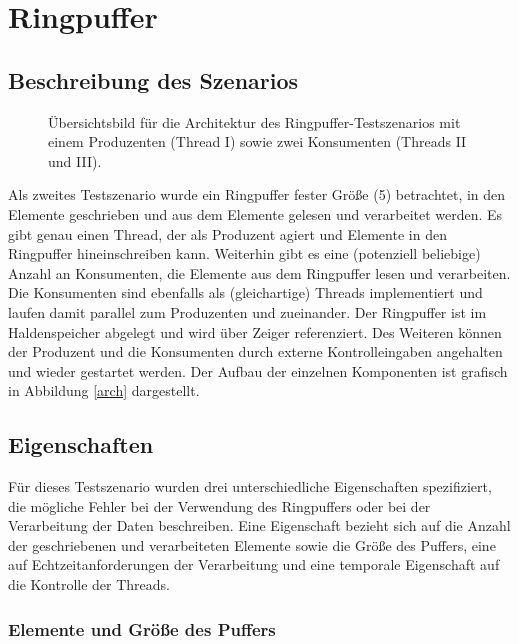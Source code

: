 \documentclass{article}
\begin{document}
\section{Ringpuffer}

\subsection{Beschreibung des Szenarios}

\begin{figure}
	\resizebox{\textwidth}{!}{}
	\caption{Übersichtsbild für die Architektur des Ringpuffer-Testszenarios mit einem Produzenten (Thread I) sowie zwei Konsumenten (Threads II und III).}
\end{figure} \label{arch}

Als zweites Testszenario wurde ein Ringpuffer fester Größe (5) betrachtet, in den Elemente geschrieben und aus dem Elemente gelesen und verarbeitet werden. Es gibt genau einen Thread, der als Produzent agiert und Elemente in den Ringpuffer hineinschreiben kann.
Weiterhin gibt es eine (potenziell beliebige) Anzahl an Konsumenten, die Elemente aus dem Ringpuffer lesen und verarbeiten. Die Konsumenten sind ebenfalls als (gleichartige) Threads implementiert und laufen damit parallel zum Produzenten und zueinander.
Der Ringpuffer ist im Haldenspeicher abgelegt und wird über Zeiger referenziert.
Des Weiteren können der Produzent und die Konsumenten durch externe Kontrolleingaben angehalten und wieder gestartet werden. Der Aufbau der einzelnen Komponenten ist grafisch in Abbildung \ref{arch} dargestellt.

\subsection{Eigenschaften}

Für dieses Testszenario wurden drei unterschiedliche Eigenschaften spezifiziert, die mögliche Fehler bei der Verwendung des Ringpuffers oder bei der Verarbeitung der Daten beschreiben. Eine Eigenschaft bezieht sich auf die Anzahl der geschriebenen und verarbeiteten Elemente sowie die Größe des Puffers, eine auf Echtzeitanforderungen der Verarbeitung und eine temporale Eigenschaft auf die Kontrolle der Threads.

\subsubsection{Elemente und Größe des Puffers}
\end{document}
